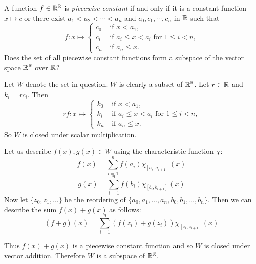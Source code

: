\begin{problem}[Golan 79]

A function $f \in \mathbb{R}^{\mathbb{R}}$ is \emph{piecewise constant} if and only if it is a
constant function $x \mapsto c$ or there exist 
$a_1 < a_2 < \cdots < a_n$ and 
$c_0, c_1, \cdots, c_n$ in $\mathbb{R}$ such that 
\[
f : x \mapsto 
\begin{cases}
  c_0 & \text{ if $x < a_1$,}\\
  c_i & \text{ if $a_i\leq x < a_i$ for $1\leq i < n$,}\\
  c_n & \text{ if $a_n\leq x$.}
\end{cases}
\]
Does the set of all piecewise constant functions form a subspace of the vector
space $\mathbb{R}^{\mathbb{R}}$ over $\mathbb{R}$?

\end{problem}
\smallskip
\begin{solution}

Let $W$ denote the set in question. $W$ is clearly a subset of $\mathbb{R}^{\mathbb{R}}$. Let $r \in \mathbb{R}$ and $k_i = rc_i$. Then
\[
rf : x \mapsto 
\begin{cases}
  k_0 & \text{ if $x < a_1$,}\\
  k_i & \text{ if $a_i\leq x < a_i$ for $1\leq i < n$,}\\
  k_n & \text{ if $a_n\leq x$.}
\end{cases}
\]
So $W$ is closed under scalar multiplication.

Let us describe $f(x),g(x) \in W$ using the characteristic function $\chi$:
$$f(x) = \sum_{i=1}^n f(a_i)\chi_{[a_i,a_{i+1}]}(x)$$
$$g(x) = \sum_{i=1}^n f(b_i)\chi_{[b_i,b_{i+1}]}(x)$$
Now let $\{z_0,z_1,\dots \}$ be the reordering of $\{a_0,a_1,\dots ,a_n,b_0,b_1,\dots ,b_n\}$. Then we can describe the sum $f(x) + g(x)$ as follows:
$$(f+g)(x) =  \sum_{i=1}^n (f(z_i)+g(z_i))\chi_{[z_i,z_{i+1}]}(x)$$

Thus $f(x) + g(x)$ is a piecewise constant function and so $W$ is closed under vector addition.  Therefore $W$ is a subspace of $\mathbb{R}^{\mathbb{R}}$.
\end{solution}
\probskip


